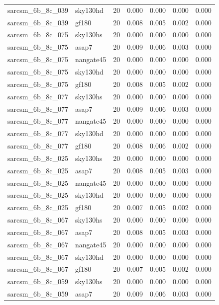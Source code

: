 \begin{tabular}{llrrrrr}
sarcsm\_6b\_8c\_039 & sky130hd & 20 & 0.000 & 0.000 & 0.000 & 0.000 \\
sarcsm\_6b\_8c\_039 & gf180 & 20 & 0.008 & 0.005 & 0.002 & 0.000 \\
sarcsm\_6b\_8c\_075 & sky130hs & 20 & 0.000 & 0.000 & 0.000 & 0.000 \\
sarcsm\_6b\_8c\_075 & asap7 & 20 & 0.009 & 0.006 & 0.003 & 0.000 \\
sarcsm\_6b\_8c\_075 & nangate45 & 20 & 0.000 & 0.000 & 0.000 & 0.000 \\
sarcsm\_6b\_8c\_075 & sky130hd & 20 & 0.000 & 0.000 & 0.000 & 0.000 \\
sarcsm\_6b\_8c\_075 & gf180 & 20 & 0.008 & 0.005 & 0.002 & 0.000 \\
sarcsm\_6b\_8c\_077 & sky130hs & 20 & 0.000 & 0.000 & 0.000 & 0.000 \\
sarcsm\_6b\_8c\_077 & asap7 & 20 & 0.009 & 0.006 & 0.003 & 0.000 \\
sarcsm\_6b\_8c\_077 & nangate45 & 20 & 0.000 & 0.000 & 0.000 & 0.000 \\
sarcsm\_6b\_8c\_077 & sky130hd & 20 & 0.000 & 0.000 & 0.000 & 0.000 \\
sarcsm\_6b\_8c\_077 & gf180 & 20 & 0.008 & 0.006 & 0.002 & 0.000 \\
sarcsm\_6b\_8c\_025 & sky130hs & 20 & 0.000 & 0.000 & 0.000 & 0.000 \\
sarcsm\_6b\_8c\_025 & asap7 & 20 & 0.008 & 0.005 & 0.003 & 0.000 \\
sarcsm\_6b\_8c\_025 & nangate45 & 20 & 0.000 & 0.000 & 0.000 & 0.000 \\
sarcsm\_6b\_8c\_025 & sky130hd & 20 & 0.000 & 0.000 & 0.000 & 0.000 \\
sarcsm\_6b\_8c\_025 & gf180 & 20 & 0.007 & 0.005 & 0.002 & 0.000 \\
sarcsm\_6b\_8c\_067 & sky130hs & 20 & 0.000 & 0.000 & 0.000 & 0.000 \\
sarcsm\_6b\_8c\_067 & asap7 & 20 & 0.008 & 0.005 & 0.003 & 0.000 \\
sarcsm\_6b\_8c\_067 & nangate45 & 20 & 0.000 & 0.000 & 0.000 & 0.000 \\
sarcsm\_6b\_8c\_067 & sky130hd & 20 & 0.000 & 0.000 & 0.000 & 0.000 \\
sarcsm\_6b\_8c\_067 & gf180 & 20 & 0.007 & 0.005 & 0.002 & 0.000 \\
sarcsm\_6b\_8c\_059 & sky130hs & 20 & 0.000 & 0.000 & 0.000 & 0.000 \\
sarcsm\_6b\_8c\_059 & asap7 & 20 & 0.009 & 0.006 & 0.003 & 0.000 \\

\end{tabular}
